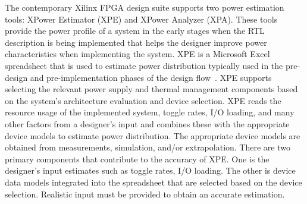 %
%

The contemporary Xilinx FPGA design suite supports two power estimation tools: XPower Estimator (XPE) and  XPower Analyzer (XPA).
These tools provide the power profile of a system in the early stages when the RTL description is being implemented that helps the designer improve power characteristics when implementing the system.
XPE is a Microsoft Excel spreadsheet that is used to estimate power distribution typically used in the pre-design and pre-implementation phases of the design flow~\cite{XPowerEstimator2011}.
XPE supports selecting the relevant power supply and thermal management components based on the system's architecture evaluation and device selection.
XPE reads the resource usage of the implemented system, toggle rates, I/O loading, and many other factors from a designer's input and combines these with the appropriate device models to estimate power distribution.
The appropriate device models are obtained from measurements, simulation, and/or extrapolation.
There are two primary components that contribute to the accuracy of XPE.
One is the designer's input estimates such as toggle rates, I/O loading.
The other is device data models integrated into the spreadsheet that are selected based on the device selection.
Realistic input must be provided to obtain an accurate estimation.

